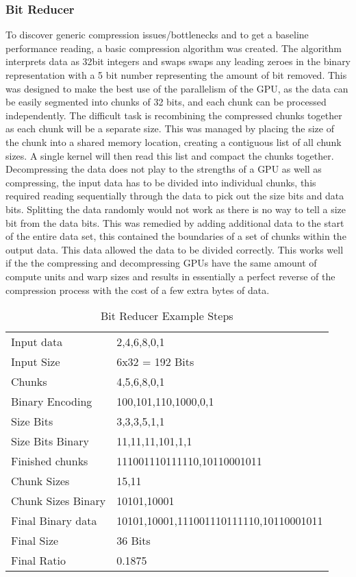 \documentclass[12pt,a4paper]{article}
\begin{document}
\subsubsection{Bit Reducer}
To discover generic compression issues/bottlenecks and to get a baseline performance reading, a basic compression algorithm was created. The algorithm interprets data as 32bit integers and swaps swaps any leading zeroes in the binary representation with a 5 bit number representing the amount of bit removed.
This was designed to make the best use of the parallelism of the GPU, as the data can be easily segmented into chunks of 32 bits, and each chunk can be processed independently. The difficult task is recombining the compressed chunks together as each chunk will be a separate size. This was managed by placing the size of the chunk into a shared memory location, creating a contiguous list of all chunk sizes. A single kernel will then read this list and compact the chunks together. Decompressing the data does not play to the strengths of a GPU as well as compressing, the input data has to be divided into individual chunks, this required reading sequentially through the data to pick out the size bits and data bits. Splitting the data randomly would not work as there is no way to tell a size bit from the data bits. This was remedied by adding additional data to the start of the entire data set, this contained the boundaries of a set of chunks within the output data. This data allowed the data to be divided correctly. This works well if the the compressing and decompressing GPUs have the same amount of compute units and warp sizes and results in essentially a perfect reverse of the compression process with the cost of a few extra bytes of data.

\begin{table*}[h]\centering
	\begin{tabular}{ll}\toprule
			Input data & 2,4,6,8,0,1\\
			Input Size & 6x32 = 192 Bits\\
			Chunks & {4,5,6},{8,0,1}\\
			Binary Encoding & {100,101,110},{1000,0,1}\\
			Size Bits & {3,3,3},{5,1,1}\\
			Size Bits Binary & {11,11,11},{101,1,1}\\
			Finished chunks & {111001110111110},{10110001011}\\
			Chunk Sizes & {15,11}\\
			Chunk Sizes Binary  & {10101,10001}\\
			Final Binary data  & 10101,10001,111001110111110,10110001011\\
			Final Size & 36 Bits\\
			Final Ratio & 0.1875\\
			\bottomrule
	\end{tabular}
	\caption{Bit Reducer Example Steps}
\end{table*}
\end{document}
